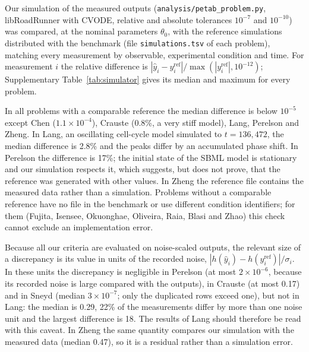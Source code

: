 
Our simulation of the measured outputs (\texttt{analysis/petab\_problem.py}, libRoadRunner with CVODE, relative and absolute tolerances $10^{-7}$ and $10^{-10}$) was compared, at the nominal parameters $\theta_0$, with the reference simulations distributed with the benchmark (file \texttt{simulations.tsv} of each problem), matching every measurement by observable, experimental condition and time. For measurement $i$ the relative difference is $|\hat y_i-y^{\mathrm{ref}}_i|/\max(|y^{\mathrm{ref}}_i|,10^{-12})$; Supplementary Table~\ref{tab:simulator} gives its median and maximum for every problem.

In all problems with a comparable reference the median difference is below $10^{-5}$ except Chen ($1.1\times10^{-4}$), Crauste (0.8\%, a very stiff model), Lang, Perelson and Zheng. In Lang, an oscillating cell-cycle model simulated to $t=136{,}472$, the median difference is 2.8\% and the peaks differ by an accumulated phase shift. In Perelson the difference is 17\%; the initial state of the SBML model is stationary and our simulation respects it, which suggests, but does not prove, that the reference was generated with other values. In Zheng the reference file contains the measured data rather than a simulation. Problems without a comparable reference have no file in the benchmark or use different condition identifiers; for them (Fujita, Isensee, Okuonghae, Oliveira, Raia, Blasi and Zhao) this check cannot exclude an implementation error.

Because all our criteria are evaluated on noise-scaled outputs, the relevant size of a discrepancy is its value in units of the recorded noise, $|h(\hat y_i)-h(y^{\mathrm{ref}}_i)|/\sigma_i$. In these units the discrepancy is negligible in Perelson (at most $2\times10^{-6}$, because its recorded noise is large compared with the outputs), in Crauste (at most 0.17) and in Sneyd (median $3\times10^{-7}$; only the duplicated rows exceed one), but not in Lang: the median is 0.29, 22\% of the measurements differ by more than one noise unit and the largest difference is 18. The results of Lang should therefore be read with this caveat. In Zheng the same quantity compares our simulation with the measured data (median 0.47), so it is a residual rather than a simulation error.

